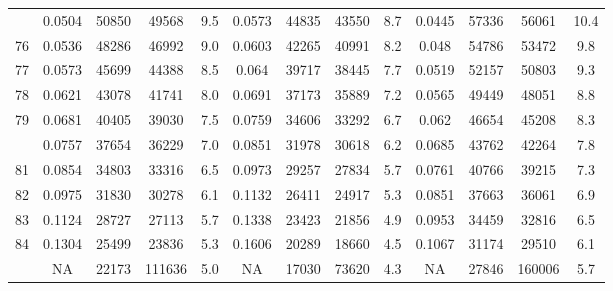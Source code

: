 \documentclass[
  14pt,
]{article}
\begin{document}
\begin{longtable}[t]{lcccccccccccc}
\addlinespace
75 & 0.0504 & 50850 & 49568 & 9.5 & 0.0573 & 44835 & 43550 & 8.7 & 0.0445 & 57336 & 56061 & 10.4\\
76 & 0.0536 & 48286 & 46992 & 9.0 & 0.0603 & 42265 & 40991 & 8.2 & 0.048 & 54786 & 53472 & 9.8\\
77 & 0.0573 & 45699 & 44388 & 8.5 & 0.064 & 39717 & 38445 & 7.7 & 0.0519 & 52157 & 50803 & 9.3\\
78 & 0.0621 & 43078 & 41741 & 8.0 & 0.0691 & 37173 & 35889 & 7.2 & 0.0565 & 49449 & 48051 & 8.8\\
79 & 0.0681 & 40405 & 39030 & 7.5 & 0.0759 & 34606 & 33292 & 6.7 & 0.062 & 46654 & 45208 & 8.3\\
\addlinespace
80 & 0.0757 & 37654 & 36229 & 7.0 & 0.0851 & 31978 & 30618 & 6.2 & 0.0685 & 43762 & 42264 & 7.8\\
81 & 0.0854 & 34803 & 33316 & 6.5 & 0.0973 & 29257 & 27834 & 5.7 & 0.0761 & 40766 & 39215 & 7.3\\
82 & 0.0975 & 31830 & 30278 & 6.1 & 0.1132 & 26411 & 24917 & 5.3 & 0.0851 & 37663 & 36061 & 6.9\\
83 & 0.1124 & 28727 & 27113 & 5.7 & 0.1338 & 23423 & 21856 & 4.9 & 0.0953 & 34459 & 32816 & 6.5\\
84 & 0.1304 & 25499 & 23836 & 5.3 & 0.1606 & 20289 & 18660 & 4.5 & 0.1067 & 31174 & 29510 & 6.1\\
\addlinespace
85 & NA & 22173 & 111636 & 5.0 & NA & 17030 & 73620 & 4.3 & NA & 27846 & 160006 & 5.7\\*
\end{longtable}
\end{document}
